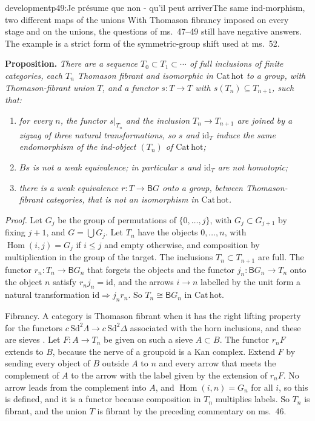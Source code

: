 \begin{dcomment}{development}{p49:Je présume que non - qu'il peut arriver}{The same ind-morphism, two different maps of the unions}
With Thomason fibrancy imposed on every stage and on the unions, the questions of ms.~47--49 still have negative answers. The example is a strict form of the symmetric-group shift used at ms.~52.

\textbf{Proposition.}\ours
\textit{There are a sequence $T_0\subset T_1\subset\cdots$ of full inclusions of finite categories, each $T_n$ Thomason fibrant and isomorphic in $\mathrm{Cat}\,\mathrm{hot}$ to a group, with Thomason-fibrant union $T$, and a functor $s:T\to T$ with $s(T_n)\subseteq T_{n+1}$, such that:}
\begin{enumerate}[label=(\alph*)]
\item \textit{for every $n$, the functor $s|_{T_n}$ and the inclusion $T_n\to T_{n+1}$ are joined by a zigzag of three natural transformations, so $s$ and $\mathrm{id}_T$ induce the same endomorphism of the ind-object $(T_n)$ of $\mathrm{Cat}\,\mathrm{hot}$;}
\item \textit{$Bs$ is not a weak equivalence; in particular $s$ and $\mathrm{id}_T$ are not homotopic;}
\item \textit{there is a weak equivalence $r:T\to\mathsf BG$ onto a group, between Thomason-fibrant categories, that is not an isomorphism in $\mathrm{Cat}\,\mathrm{hot}$.}
\end{enumerate}

\textit{Proof.}
Let $G_j$ be the group of permutations of $\{0,\dots,j\}$, with $G_j\subset G_{j+1}$ by fixing $j+1$, and $G=\bigcup G_j$. Let $T_n$ have the objects $0,\dots,n$, with $\operatorname{Hom}(i,j)=G_j$ if $i\leq j$ and empty otherwise, and composition by multiplication in the group of the target. The inclusions $T_n\subset T_{n+1}$ are full. The functor $r_n:T_n\to\mathsf BG_n$ that forgets the objects and the functor $j_n:\mathsf BG_n\to T_n$ onto the object $n$ satisfy $r_nj_n=\mathrm{id}$, and the arrows $i\to n$ labelled by the unit form a natural transformation $\mathrm{id}\Rightarrow j_nr_n$. So $T_n\cong\mathsf BG_n$ in $\mathrm{Cat}\,\mathrm{hot}$.

Fibrancy. A category is Thomason fibrant when it has the right lifting property for the functors $c\,\mathrm{Sd}^2\Lambda\to c\,\mathrm{Sd}^2\Delta$ associated with the horn inclusions, and these are sieves \citep[Proposition~4.2]{Thomason1980}. Let $F:A\to T_n$ be given on such a sieve $A\subset B$. The functor $r_nF$ extends to $B$, because the nerve of a groupoid is a Kan complex. Extend $F$ by sending every object of $B$ outside $A$ to $n$ and every arrow that meets the complement of $A$ to the arrow with the label given by the extension of $r_nF$. No arrow leads from the complement into $A$, and $\operatorname{Hom}(i,n)=G_n$ for all $i$, so this is defined, and it is a functor because composition in $T_n$ multiplies labels. So $T_n$ is fibrant, and the union $T$ is fibrant by the preceding commentary on ms.~46.


\end{dcomment}
